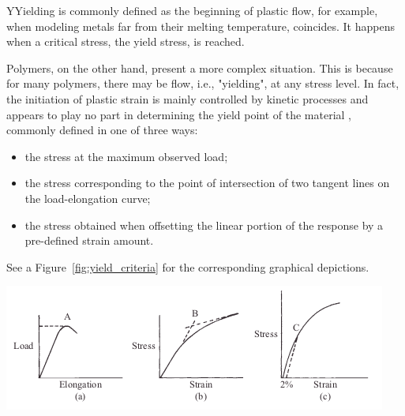 \begin{remark}
	YYielding is commonly defined as the beginning of plastic flow, for example, when modeling  metals far from their melting temperature, coincides.
	It happens when a critical stress, the yield stress, is reached.

	Polymers, on the other hand, present a more complex situation.
	This is because for many polymers, there may be flow, i.e., "yielding", at any stress level.
	In fact, the initiation of plastic strain is mainly controlled by kinetic processes and appears to play no part in determining the yield point of the material \citep{fotheringhamRoleRecoveryForces1978}, commonly defined in one of three ways: \citep{wardReviewYieldBehaviour1971}
	\begin{itemize}
		\item the stress at the maximum observed load;
		\item the stress corresponding to the point of intersection of two tangent lines on the load-elongation curve;
		\item the stress obtained when offsetting the linear portion of the response by a pre-defined strain amount.
	\end{itemize}
	See a Figure~\ref{fig:yield_criteria} for the corresponding graphical depictions.
	\begin{center}
		\centering
		\includegraphics[scale=0.5]{figures/yield_criteria}
		\label{fig:yield_criteria}
	\end{center}
\label{rmrk:yield_polymer}
\end{remark}

